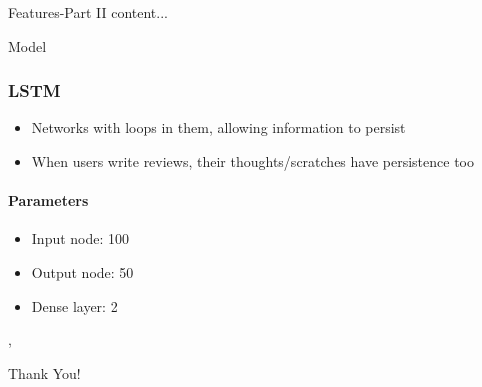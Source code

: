 \documentclass[10pt]{beamer}
\begin{document}
\begin{frame}{Features-Part II}
content...
\end{frame}
\begin{frame}{Model}
\frametitle{LSTM}
\begin{itemize}
	\item Networks with loops in them, allowing information to persist
	\item When users write reviews, their thoughts/scratches have persistence too
\end{itemize}
\framesubtitle{Parameters}
\begin{itemize}
	\item Input node: 100
	\item Output node: 50
	\item Dense layer: 2
\end{itemize},
\end{frame}
\begin{frame}
\Huge{\centerline{Thank You!}}
\end{frame}
\end{document}
